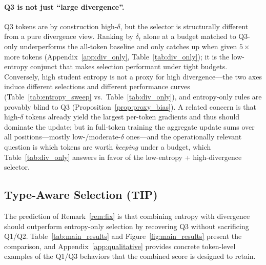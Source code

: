 \documentclass{article}
\begin{document}
\paragraph{Q3 is not just ``large divergence''.}
Q3 tokens are by construction high-$\delta$, but the selector is structurally different from a pure divergence view.
Ranking by $\delta_t$ alone at a budget matched to Q3-only underperforms the all-token baseline and only catches up when given $5\times$ more tokens (Appendix~\ref{app:div_only}, Table~\ref{tab:div_only}); it is the low-entropy conjunct that makes selection performant under tight budgets.
Conversely, high student entropy is not a proxy for high divergence---the two axes induce different selections and different performance curves (Table~\ref{tab:entropy_sweep} vs.\ Table~\ref{tab:div_only}), and entropy-only rules are provably blind to Q3 (Proposition~\ref{prop:proxy_bias}).
A related concern is that high-$\delta$ tokens already yield the largest per-token gradients and thus should dominate the update; but in full-token training the aggregate update sums over all positions---mostly low-/moderate-$\delta$ ones---and the operationally relevant question is which tokens are worth \emph{keeping} under a budget, which Table~\ref{tab:div_only} answers in favor of the low-entropy + high-divergence selector.

\subsection{Type-Aware Selection (TIP)}
\label{sec:type_aware_results}

The prediction of Remark~\ref{rem:fix} is that combining entropy with divergence should outperform entropy-only selection by recovering Q3 without sacrificing Q1/Q2.
Table~\ref{tab:main_results} and Figure~\ref{fig:main_results} present the comparison, and Appendix~\ref{app:qualitative} provides concrete token-level examples of the Q1/Q3 behaviors that the combined score is designed to retain.
\end{document}
